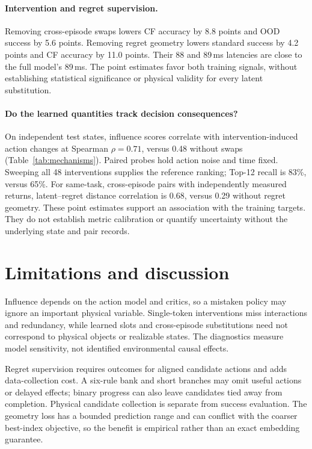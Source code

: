 \documentclass{article}
\begin{document}
\paragraph{Intervention and regret supervision.}
Removing cross-episode swaps lowers CF accuracy by 8.8 points and OOD success by 5.6 points. Removing regret geometry lowers standard success by 4.2 points and CF accuracy by 11.0 points. Their 88 and 89\,ms latencies are close to the full model's 89\,ms. The point estimates favor both training signals, without establishing statistical significance or physical validity for every latent substitution.


\paragraph{Do the learned quantities track decision consequences?}
On independent test states, influence scores correlate with intervention-induced action changes at Spearman $\rho=0.71$, versus 0.48 without swaps (Table~\ref{tab:mechanisms}). Paired probes hold action noise and time fixed. Sweeping all 48 interventions supplies the reference ranking; Top-12 recall is 83\%, versus 65\%. For same-task, cross-episode pairs with independently measured returns, latent--regret distance correlation is 0.68, versus 0.29 without regret geometry. These point estimates support an association with the training targets. They do not establish metric calibration or quantify uncertainty without the underlying state and pair records.

\section{Limitations and discussion}
\label{sec:limitations}
Influence depends on the action model and critics, so a mistaken policy may ignore an important physical variable. Single-token interventions miss interactions and redundancy, while learned slots and cross-episode substitutions need not correspond to physical objects or realizable states. The diagnostics measure model sensitivity, not identified environmental causal effects.

Regret supervision requires outcomes for aligned candidate actions and adds data-collection cost. A six-rule bank and short branches may omit useful actions or delayed effects; binary progress can also leave candidates tied away from completion. Physical candidate collection is separate from success evaluation. The geometry loss has a bounded prediction range and can conflict with the coarser best-index objective, so the benefit is empirical rather than an exact embedding guarantee.
\end{document}
